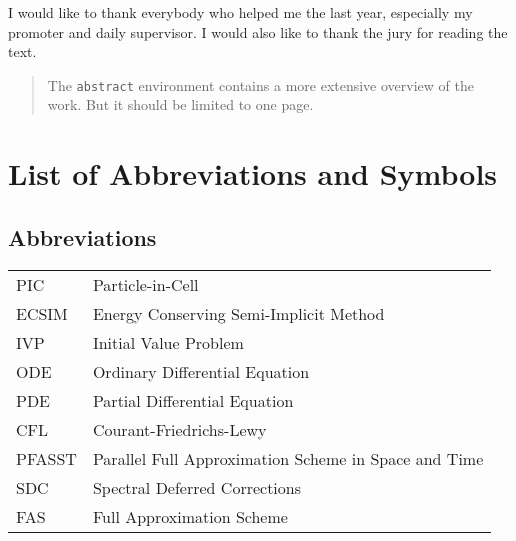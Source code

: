 \documentclass[master=wit, english]{kulemt}
\begin{document}
\begin{preface}
  I would like to thank everybody who helped me the last year,
  especially my promoter and daily supervisor. I would also like to thank the jury for reading the text. 
\end{preface}

\tableofcontents*

\begin{abstract}
  The \texttt{abstract} environment contains a more extensive overview of
  the work. But it should be limited to one page.

  \lipsum[1]
\end{abstract}

\listoffiguresandtables
\chapter{List of Abbreviations and Symbols}
\section*{Abbreviations}
\begin{flushleft}
  \renewcommand{\arraystretch}{1.1}
  \begin{tabularx}{\textwidth}{@{}p{12mm}X@{}}
  	PIC & Particle-in-Cell\\
    ECSIM   & Energy Conserving Semi-Implicit Method \cite{lapenta_exactly_2017}\\
    IVP & Initial Value Problem\\
    ODE & Ordinary Differential Equation\\
    PDE & Partial Differential Equation\\
    CFL  & Courant-Friedrichs-Lewy \cite{courant_uber_1928} \\
    PFASST   & Parallel Full Approximation Scheme in Space and Time \cite{emmett_toward_2012}\\
    SDC & Spectral Deferred Corrections \cite{dutt_spectral_2000}\\
    FAS & Full Approximation Scheme \cite{brandt_multi-level_1976} \\
  \end{tabularx}
\end{flushleft}
\end{document}
